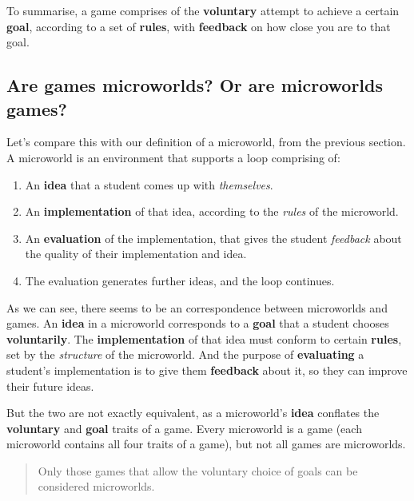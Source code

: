 To summarise, a game comprises of the \textbf{voluntary} attempt to
achieve a certain \textbf{goal}, according to a set of \textbf{rules},
with \textbf{feedback} on how close you are to that goal.

\subsection{Are games microworlds? Or are microworlds games?}

Let's compare this with our definition of a microworld, from the
previous section. A microworld is an environment that supports a loop
comprising of:

\begin{enumerate}

\item
  An \textbf{idea} that a student comes up with \emph{themselves}.

\item
  An \textbf{implementation} of that idea, according to the \emph{rules}
  of the microworld.

\item
  An \textbf{evaluation} of the implementation, that gives the student
  \emph{feedback} about the quality of their implementation and idea.

\item
  The evaluation generates further ideas, and the loop continues.

\end{enumerate}

As we can see, there seems to be an correspondence between microworlds and
games. An \textbf{idea} in a microworld corresponds to a \textbf{goal}
that a student chooses \textbf{voluntarily}. The \textbf{implementation}
of that idea must conform to certain \textbf{rules}, set by the
\emph{structure} of the microworld. And the purpose of
\textbf{evaluating} a student's implementation is to give them
\textbf{feedback} about it, so they can improve their future ideas.

But the two are not exactly equivalent, as a microworld's \textbf{idea}
conflates the \textbf{voluntary} and \textbf{goal} traits of a game.
Every microworld is a game (each microworld contains all four traits of
a game), but not all games are microworlds.

\begin{quote}
Only those games that allow the voluntary choice of goals can be
considered microworlds.
\end{quote}

